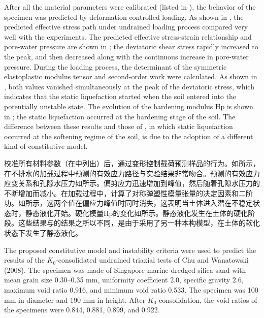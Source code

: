 \begin{ParaColumn}
    After all the material parameters were calibrated (listed in ), the behavior of the specimen was predicted by deformation-controlled loading. As shown in , the predicted effective stress path under undrained loading process compared very well with the experiments. The predicted effective stress-strain relationship and pore-water pressure are shown in ; the deviatoric shear stress rapidly increased to the peak, and then decreased along with the continuous increase in pore-water pressure. During the loading process, the determinant of the symmetric elastoplastic modulus tensor and second-order work were calculated. As shown in , both values vanished simultaneously at the peak of the deviatoric stress, which indicates that the static liquefaction started when the soil entered into the potentially unstable state. The evolution of the hardening modulus Hp is shown in ; the static liquefaction occurred at the hardening stage of the soil. The difference between these results and those of \citet{Andrade2009}, in which static liquefaction occurred at the softening regime of the soil, is due to the adoption of a different kind of constitutive model.

    \switchcolumn

    校准所有材料参数（在中列出）后，通过变形控制载荷预测样品的行为。如所示，在不排水的加载过程中预测的有效应力路径与实验结果非常吻合。预测的有效应力应变关系和孔隙水压力如所示。偏剪应力迅速增加到峰值，然后随着孔隙水压力的不断增加而减小。在加载过程中，计算了对称弹塑性模量张量的决定因素和二阶功。如所示，这两个值在偏应力峰值时同时消失，这表明当土体进入潜在不稳定状态时，静态液化开始。硬化模量Hp的变化如所示。静态液化发生在土体的硬化阶段。这些结果与\citet{Andrade2009}的结果之所以不同，是由于采用了另一种本构模型，在土体的软化状态下发生了静态液化。

    \CrossColumnText{
        
        
        
    }

    The proposed constitutive model and instability criteria were used to predict the results of the $K_0$-consolidated undrained triaxial tests of Chu and Wanatowski (2008). The specimen was made of Singapore marine-dredged silica sand with mean grain size 0.30–0.35 mm, uniformity coefficient 2.0, specific gravity 2.6, maximum void ratio 0.916, and minimum void ratio 0.533. The specimen was 100 mm in diameter and 190 mm in height. After $K_0$ consolidation, the void ratios of the specimens were 0.844, 0.881, 0.899, and 0.922.


\end{ParaColumn}
